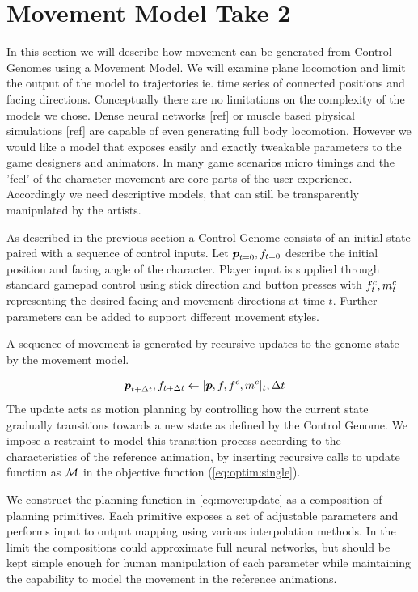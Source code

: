 \section{Movement Model Take 2}
In this section we will describe how movement can be generated from Control Genomes using a Movement Model. We will examine plane locomotion and limit the output of the model to trajectories ie. time series of connected positions and facing directions. 
Conceptually there are no limitations on the complexity of the models we chose. Dense neural networks [ref] or muscle based physical simulations [ref] are capable of even generating full body locomotion. However we would like a model that exposes easily and exactly tweakable parameters to the game designers and animators. In many game scenarios micro timings and the 'feel' of the character movement are core parts of the user experience. Accordingly we need descriptive models, that can still be transparently manipulated by the artists. 

As described in the previous section a Control Genome consists of an initial state paired with a sequence of control inputs. Let $\boldsymbol{p }_{t=0},f_{t=0}$ describe the initial position and facing angle of the character. Player input is supplied through standard gamepad control using stick direction and button presses with $f^c_t, m^c_t$ representing the desired facing and movement directions at time $t$. Further parameters can be added to support different movement styles.   

A sequence of movement is generated by recursive updates to the genome state by the movement model.

\begin{subequations}
\begin{align}
    \boldsymbol{p }_{t+\Delta{t}},f_{t+\Delta{t}}&\leftarrow[\boldsymbol{p },f,f^c,m^c]_t,\Delta{t}\label{eq:move:update}
\end{align}
\end{subequations}
The update  acts as motion planning by controlling how the current state gradually transitions towards a new state as defined by the Control Genome. We impose a restraint to model this transition process according to the characteristics of the reference animation, by inserting recursive calls to update function as $\mathcal{M}$ in the objective function (\ref{eq:optim:single}).

We construct the planning function in \ref{eq:move:update} as a composition of planning primitives. Each primitive exposes a set of adjustable parameters and performs input to output mapping using various interpolation methods. In the limit the compositions could approximate full neural networks, but should be kept simple enough for human manipulation of each parameter while maintaining the capability to model the movement in the reference animations.     

